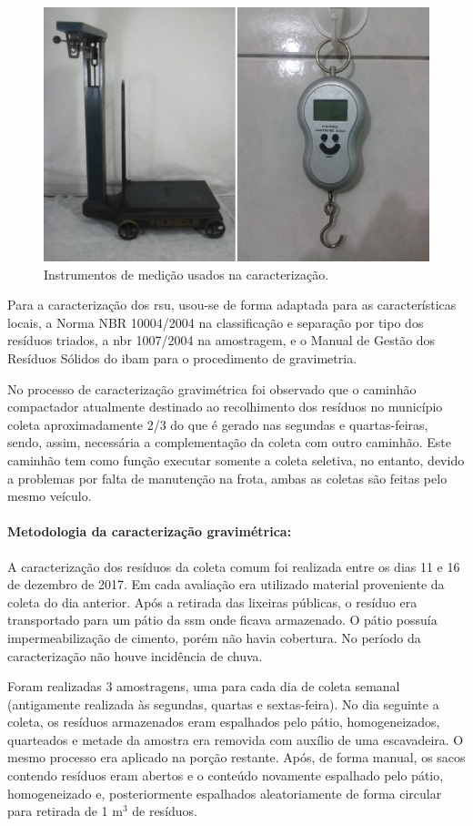 	\begin{figure}
		\centering
		\includegraphics[width=0.7\linewidth]{produtos/prodtres/image021_22}
		\caption{Instrumentos de medição usados na caracterização.}
		\label{fig:image021_22}
	\end{figure}


	Para a caracterização dos \gls{rsu}, usou-se de forma adaptada para as características locais, a Norma NBR 10004/2004 na classificação e separação por tipo dos resíduos triados, a \gls{nbr} 1007/2004 na amostragem, e o Manual de Gestão dos Resíduos Sólidos do \gls{ibam} para o procedimento de gravimetria.
	
	No processo de caracterização gravimétrica foi observado que o caminhão compactador atualmente destinado ao recolhimento dos resíduos no município coleta aproximadamente 2/3 do que é gerado nas segundas e quartas-feiras, sendo, assim, necessária a complementação da coleta com outro caminhão. Este caminhão tem como função executar somente a coleta seletiva, no entanto, devido a problemas por falta de manutenção na frota, ambas as coletas são feitas pelo mesmo veículo.
	
	\paragraph{\textbf{Metodologia da caracterização gravimétrica:}}
	
	A caracterização dos resíduos da coleta comum foi realizada entre os dias 11 e 16 de dezembro de 2017. Em cada avaliação era utilizado material proveniente da coleta do dia anterior. Após a retirada das lixeiras públicas, o resíduo era transportado para um pátio da \gls{ssm} onde ficava armazenado. O pátio possuía impermeabilização de cimento, porém não havia cobertura. No período da caracterização não houve incidência de chuva.
	
	Foram realizadas 3 amostragens, uma para cada dia de coleta semanal (antigamente realizada às segundas, quartas e sextas-feira). No dia seguinte a coleta, os resíduos armazenados eram espalhados pelo pátio, homogeneizados, quarteados e metade da amostra era removida com auxílio de uma escavadeira. O mesmo processo era aplicado na porção restante. Após, de forma manual, os sacos contendo resíduos eram abertos e o conteúdo novamente espalhado pelo pátio, homogeneizado e, posteriormente espalhados aleatoriamente de forma circular para retirada de 1 m$^{3}$ de resíduos.
	
